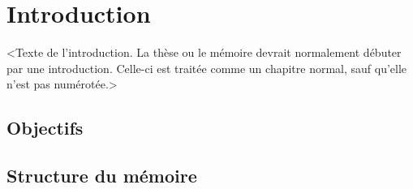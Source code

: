 \chapter{Introduction}
\label{chap:introduction}       %

<Texte de l'introduction. La thèse ou le mémoire devrait normalement
débuter par une introduction. Celle-ci est traitée comme un chapitre
normal, sauf qu'elle n'est pas numérotée.>

\section{Objectifs}

\section{Structure du mémoire}